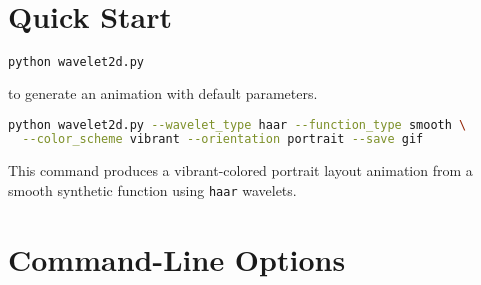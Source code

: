 \documentclass[12pt]{article}
\begin{document}
\section{Quick Start}
\begin{lstlisting}[language=bash]
python wavelet2d.py 
\end{lstlisting}
to generate an animation with default parameters.
\begin{lstlisting}[language=bash]
python wavelet2d.py --wavelet_type haar --function_type smooth \
  --color_scheme vibrant --orientation portrait --save gif
\end{lstlisting}
This command produces a vibrant-colored portrait layout animation from a smooth synthetic function using \texttt{haar} wavelets.

\section{Command-Line Options}
\end{document}
